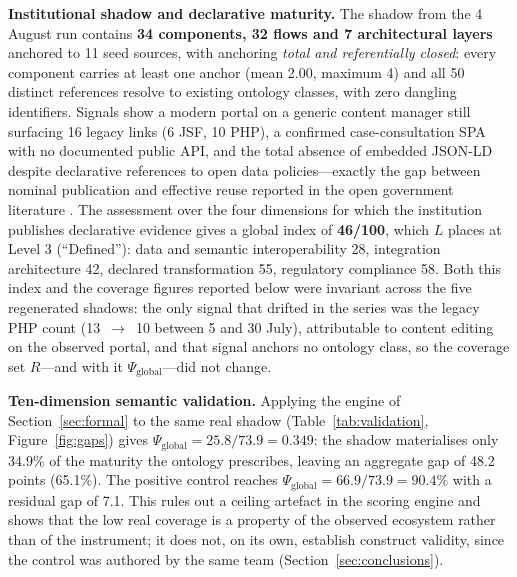 \documentclass[engproc,proceedingpaper,submit,moreauthors]{Definitions/mdpi}
\begin{document}
\textbf{Institutional shadow and declarative maturity.} The shadow from the 4 August run contains \textbf{34 components, 32 flows and 7 architectural layers} anchored to 11 seed sources, with anchoring \emph{total and referentially closed}: every component carries at least one anchor (mean 2.00, maximum 4) and all 50 distinct references resolve to existing ontology classes, with zero dangling identifiers. Signals show a modern portal on a generic content manager still surfacing 16 legacy links (6 JSF, 10 PHP), a confirmed case-consultation SPA with no documented public API, and the total absence of embedded JSON-LD despite declarative references to open data policies---exactly the gap between nominal publication and effective reuse reported in the open government literature \cite{Janssen2012,Attard2015}. The assessment over the four dimensions for which the institution publishes declarative evidence gives a global index of \textbf{46/100}, which $L$ places at Level 3 (``Defined''): data and semantic interoperability 28, integration architecture 42, declared transformation 55, regulatory compliance 58. Both this index and the coverage figures reported below were invariant across the five regenerated shadows: the only signal that drifted in the series was the legacy PHP count (13~$\rightarrow$~10 between 5 and 30 July), attributable to content editing on the observed portal, and that signal anchors no ontology class, so the coverage set $R$---and with it $\Psi_{\mathrm{global}}$---did not change.

\textbf{Ten-dimension semantic validation.} Applying the engine of Section~\ref{sec:formal} to the same real shadow (Table~\ref{tab:validation}, Figure~\ref{fig:gaps}) gives $\Psi_{\mathrm{global}}=25.8/73.9=\mathbf{0.349}$: the shadow materialises only 34.9\% of the maturity the ontology prescribes, leaving an aggregate gap of 48.2 points (65.1\%). The positive control reaches $\Psi_{\mathrm{global}}=66.9/73.9=90.4\%$ with a residual gap of 7.1. This rules out a ceiling artefact in the scoring engine and shows that the low real coverage is a property of the observed ecosystem rather than of the instrument; it does not, on its own, establish construct validity, since the control was authored by the same team (Section~\ref{sec:conclusions}).
\end{document}
